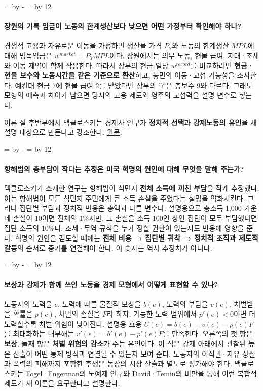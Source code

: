 \documentclass[10pt,a4paper]{article}
\newcommand{\ReserveQuestionSpace}{%
  \par\begingroup
  \dimen0=\pagegoal \advance\dimen0 by -\pagetotal
  \dimen2=\baselineskip \multiply\dimen2 by 12
  \ifdim\dimen0<\dimen2 \newpage\fi
  \endgroup}
\begin{document}
\ReserveQuestionSpace
\paragraph{장원의 기록 임금이 노동의 한계생산보다 낮으면 어떤 가정부터 확인해야 하나?}
경쟁적 고용과 자유로운 이동을 가정하면 생산물 가격 $P_Y$와 노동의 한계생산 $MPL$에 대해 명목임금은 $w^{market}=P_YMPL$이다. 장원에서는 의무 노동, 현물 급여, 지대·조세와 이동 제약이 함께 작용한다. 따라서 장부의 현금 일당 $w^{record}$를 비교하려면 \textbf{현금·현물 보수와 노동시간을 같은 기준으로 환산}하고, 농민의 이동·교섭 가능성을 조사한다. 예컨대 현금 7에 현물 급여 2를 받았다면 장부의 ‘7’은 총보수 9와 다르다. 그래도 모형의 예측과 차이가 남으면 당시의 고용 제도와 영주의 교섭력을 설명 변수로 넣는다.\par

이론 절 후반부에서 맥클로스키는 경제사 연구가 \textbf{정치적 선택}과 \textbf{강제노동의 유인}을 새 설명 대상으로 만든다고 강조한다. \href{https://www.deirdremccloskey.com/docs/pdf/Article\_92.pdf}{원문}.\par

\ReserveQuestionSpace
\paragraph{항해법의 총부담이 작다는 추정은 미국 혁명의 원인에 대해 무엇을 말해 주는가?}
맥클로스키가 소개한 연구는 항해법이 식민지 \textbf{전체 소득에 끼친 부담}을 작게 추정했다. 이는 항해법이 모든 식민지 주민에게 큰 소득 손실을 주었다는 설명을 약화시킨다. 그러나 집단별 부담과 정치적 반응은 총액과 다른 변수다. 설명용으로 총소득 1,000 가운데 손실이 10이면 전체의 1\%지만, 그 손실을 소득 100인 상인 집단이 모두 부담했다면 집단 소득의 10\%다. 조세·무역 규칙을 누가 정할 권한이 있는지도 반응에 영향을 준다. 혁명의 원인을 검토할 때에는 \textbf{전체 비용 → 집단별 귀착 → 정치적 조직과 제도적 갈등}의 순서로 증거를 연결해야 한다. 이 숫자는 역사 추정치가 아니다.\par

\ReserveQuestionSpace
\paragraph{보상과 강제가 함께 쓰인 노동을 경제 모형에서 어떻게 표현할 수 있나?}
노동자의 노력을 $e$, 노력에 따른 물질적 보상을 $b(e)$, 노력의 부담을 $v(e)$, 처벌받을 확률을 $p(e)$, 처벌의 손실을 $F$라 하자. 가능한 노력 범위에서 $p'(e)<0$이면 더 노력할수록 처벌 위험이 낮아진다. 설명용 효용 $U(e)=b(e)-v(e)-p(e)F$를 최대화하는 내부해는 $v'(e)=b'(e)-p'(e)F$를 만족한다. 오른쪽의 첫 항은 \textbf{보상}, 둘째 항은 \textbf{처벌 위험의 감소}가 주는 유인이다. 이 식은 강제 아래에서 관찰된 높은 산출이 어떤 통제 방식과 연결될 수 있는지 보여 준다. 노동자의 이직권·자유 상실과 폭력의 피해까지 포함한 후생은 농장의 시장 산출과 별도로 평가해야 한다. 맥클로스키는 Fogel·Engerman의 노예제 연구와 David·Temin의 비판을 통해 이런 복합적 제도가 새 이론을 요구한다고 설명한다.\par
\end{document}

